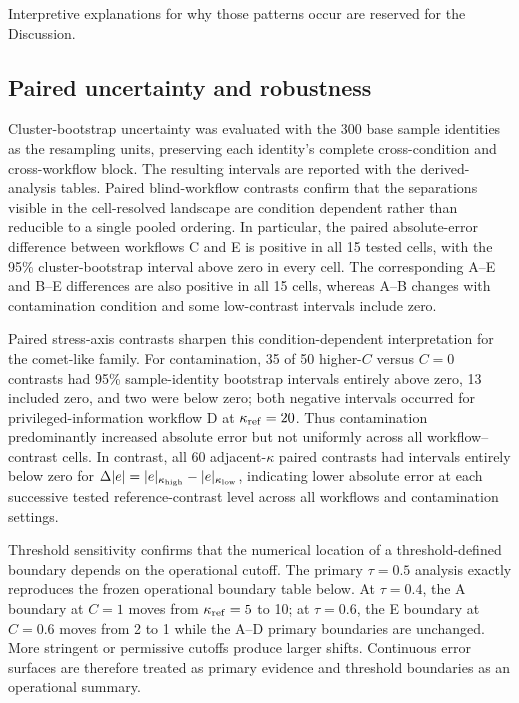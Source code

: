 Interpretive explanations for why those patterns occur are reserved for
the Discussion.

\subsection{Paired uncertainty and
robustness}\label{paired-uncertainty-and-robustness}

Cluster-bootstrap uncertainty was evaluated with the 300 base sample
identities as the resampling units, preserving each identity's complete
cross-condition and cross-workflow block. The resulting intervals are
reported with the derived-analysis tables. Paired blind-workflow
contrasts confirm that the separations visible in the cell-resolved
landscape are condition dependent rather than reducible to a single
pooled ordering. In particular, the paired absolute-error difference
between workflows C and E is positive in all 15 tested cells, with the
95\% cluster-bootstrap interval above zero in every cell. The
corresponding A--E and B--E differences are also positive in all 15
cells, whereas A--B changes with contamination condition and some
low-contrast intervals include zero.

Paired stress-axis contrasts sharpen this condition-dependent
interpretation for the comet-like family. For contamination, 35 of 50
higher-\(C\) versus \(C=0\) contrasts had 95\% sample-identity
bootstrap intervals entirely above zero, 13 included zero, and two were
below zero; both negative intervals occurred for privileged-information
workflow D at \(\kappa_{\rm ref}=20\). Thus contamination
predominantly increased absolute error but not uniformly across all
workflow--contrast cells. In contrast, all 60 adjacent-\(\kappa\)
paired contrasts had intervals entirely below zero for
\(\Delta|e|=|e|_{\kappa_{\rm high}}-|e|_{\kappa_{\rm low}}\),
indicating lower absolute error at each successive tested
reference-contrast level across all workflows and contamination
settings.

Threshold sensitivity confirms that the numerical location of a
threshold-defined boundary depends on the operational cutoff. The
primary \(\tau=0.5\) analysis exactly reproduces the frozen operational
boundary table below. At \(\tau=0.4\), the A boundary at \(C=1\) moves
from \(\kappa_{\rm ref}=5\) to 10; at \(\tau=0.6\), the E boundary at
\(C=0.6\) moves from 2 to 1 while the A--D primary boundaries are
unchanged. More stringent or permissive cutoffs produce larger shifts.
Continuous error surfaces are therefore treated as primary evidence and
threshold boundaries as an operational summary.

